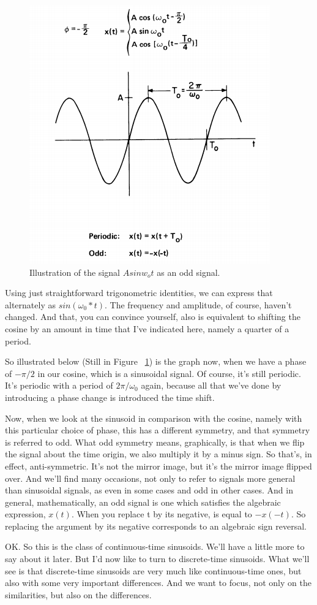 \documentclass[fleqn,10pt]{olplainarticle}
\theoremstyle{definition}
\theoremstyle{remark}
\begin{document}
\begin{figure}[ht]
\centering
\includegraphics[width=0.5\linewidth]{images/signals_04.png}
\caption{Illustration of the signal $A sin w_o t$ as an odd signal.}
\label{fig:signals_04}
\end{figure}

Using just straightforward trigonometric identities, we can express that alternately as $sin(\omega_0*t)$. The frequency and amplitude, of course, haven't changed. And that, you can convince yourself, also is equivalent to shifting the cosine by an amount in time that I've indicated here, namely a quarter of a period.

So illustrated below (Still in Figure ~\ref{fig:signals_04}) is the graph now, when we have a phase of $-\pi/2$ in our cosine, which is a sinusoidal signal. Of course, it's still periodic. It's periodic with a period of $2 \pi / \omega_0$ again, because all that we've done by introducing a phase change is introduced the time shift.

Now, when we look at the sinusoid in comparison with the cosine, namely with this particular choice of phase, this has a different symmetry, and that symmetry is referred to odd. What odd symmetry means, graphically, is that when we flip the signal about the time origin, we also multiply it by a minus sign. So that's, in effect, anti-symmetric. It's not the mirror image, but it's the mirror image flipped over. And we'll find many occasions, not only to refer to signals more general than sinusoidal signals, as even in some cases and odd in other cases. And in general, mathematically, an odd signal is one which satisfies the algebraic expression, $x(t)$. When you replace t by its negative, is equal to $-x(-t)$. So replacing the argument by its negative corresponds to an algebraic sign reversal.

OK. So this is the class of continuous-time sinusoids. We'll have a little more to say about it later. But I'd now like to turn to discrete-time sinusoids. What we'll see is that discrete-time sinusoids are very much like continuous-time ones, but also with some very important differences. And we want to focus, not only on the similarities, but also on the differences.
\end{document}
